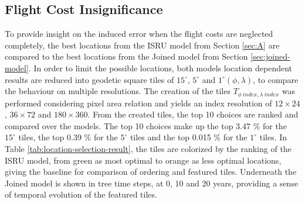 \documentclass[utf8]{FrontiersinHarvard} %
\begin{document}
\subsection{Flight Cost Insignificance}

To provide insight on the induced error when the flight costs are neglected completely, the best locations from the ISRU model from Section \ref{sec:A} are compared to the best locations from the Joined model from Section \ref{sec:joined-model}.
In order to limit the possible locations, both models location dependent results are reduced into geodetic square tiles of  $15^{\circ}$, $5^{\circ}$  and $1^{\circ} (\phi , \lambda)$, to compare the behaviour on multiple resolutions.
The creation of the tiles $T_{\phi \ index, \lambda \ index}$ was performed considering pixel area relation and yields an index resolution of $12 \times 24$, $36 \times 72$ and $180 \times 360$.
From the created tiles, the top 10 choices are ranked and compared over the models. The top 10 choices make up the top 3.47 \% for the $15^{\circ}$ tiles, the top 0.39 \% for the $5^{\circ}$ tiles and the top 0.015 \% for the $1^{\circ}$ tiles.
In Table \ref{tab:location-selection-result}, the tiles are colorized by the ranking of the ISRU model, from green as most optimal to orange as less optimal locations, giving the baseline for comparison of ordering and featured tiles.
Underneath the Joined model is shown in tree time steps, at 0, 10 and 20 years, providing a sense of temporal evolution of the featured tiles. 
\end{document}
